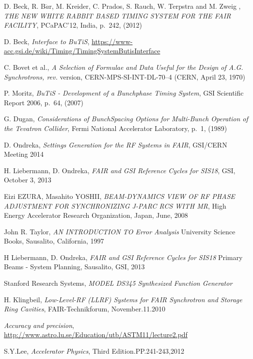 \begin{thebibliography}{99} 

	D. Beck, R. B$\ddot{a}$r, M. Kreider, C. Prados, S. Rauch, W. Terpstra and M. Zweig ,
	\textit{THE NEW WHITE RABBIT BASED TIMING SYSTEM FOR THE FAIR FACILITY},
	PCaPAC'12, India, p.~242, (2012)

	D. Beck, 
     \textit{Interface to BuTiS},
	\url{https://www-acc.gsi.de/wiki/Timing/TimingSystemButisInterface}

	C. Bovet et al.,
     \textit{A Selection of Formulae and Data Useful for the Design of A.G. Synchrotrons,
rev.}
	version, CERN-MPS-SI-INT-DL-70–4 (CERN, April 23, 1970)

	P. Moritz,
	\textit{BuTiS - Development of a Bunchphase Timing System},
	GSI Scientific Report 2006, p.~64, (2007)

	G. Dugan,
	\textit{Considerations of BunchSpacing Options for Multi-Bunch Operation of the Tevatron Collider},
	Fermi National Accelerator Laboratory, p.~1, (1989)


     D. Ondreka,
	\textit{Settings Generation for the RF Systems in FAIR},
	GSI/CERN Meeting 2014

     H. Liebermann, D. Ondreka,
	\textit{FAIR and GSI Reference Cycles for SIS18},
	GSI, October 3, 2013

     Eizi EZURA, Masahito YOSHII,
	\textit{BEAM-DYNAMICS VIEW OF RF PHASE ADJUSTMENT FOR SYNCHRONIZING J-PARC RCS WITH MR},
	High Energy Accelerator Research Organization, Japan, June, 2008

    John R. Taylor,
    \textit{AN INTRODUCTION TO Error Analysis} 
    University Science Books, Sausalito, California, 1997

    H Liebermann, D. Ondreka,
    \textit{FAIR and GSI Reference Cycles for SIS18} 
    Primary Beams - System Planning, Sausalito, GSI, 2013 

     Stanford Research Systems,
	\textit{MODEL DS345 Synthesized Function Generator}

      H. Klingbeil,
      \textit{Low-Level-RF (LLRF) Systems for FAIR Synchrotron and Storage Ring Cavities},
      FAIR-Technikforum, November.11.2010

     \textit{Accuracy and precision},
	\url{http://www.astro.lu.se/Education/utb/ASTM11/lecture2.pdf}

      S.Y.Lee,
      \textit{Accelerator 	Physics},
      Third Edition.PP.241-243,2012 
\addtocounter{enumi}{10}





\end{thebibliography}





